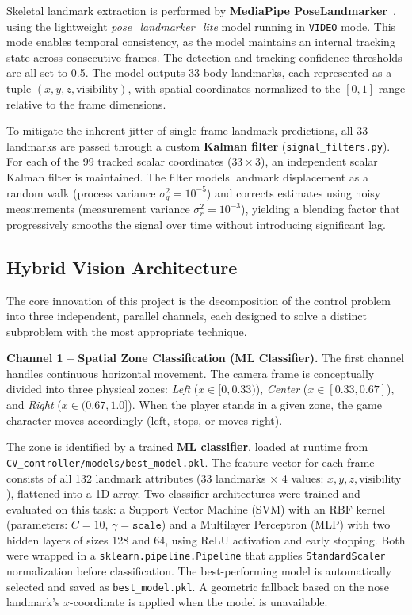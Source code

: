 \documentclass[10pt,twocolumn,a4paper]{article}
\begin{document}
	Skeletal landmark extraction is performed by \textbf{MediaPipe PoseLandmarker}~\cite{lugaresi2019mediapipe}, using the lightweight \textit{pose\_landmarker\_lite} model running in \texttt{VIDEO} mode. This mode enables temporal consistency, as the model maintains an internal tracking state across consecutive frames. The detection and tracking confidence thresholds are all set to 0.5. The model outputs 33 body landmarks, each represented as a tuple $(x, y, z, \text{visibility})$, with spatial coordinates normalized to the $[0, 1]$ range relative to the frame dimensions.

	To mitigate the inherent jitter of single-frame landmark predictions, all 33 landmarks are passed through a custom \textbf{Kalman filter} (\texttt{signal\_filters.py}). For each of the 99 tracked scalar coordinates ($33 \times 3$), an independent scalar Kalman filter is maintained. The filter models landmark displacement as a random walk (process variance $\sigma^2_q = 10^{-5}$) and corrects estimates using noisy measurements (measurement variance $\sigma^2_r = 10^{-3}$), yielding a blending factor that progressively smooths the signal over time without introducing significant lag.

	\subsection{Hybrid Vision Architecture}

	The core innovation of this project is the decomposition of the control problem into three independent, parallel channels, each designed to solve a distinct subproblem with the most appropriate technique.

	\vspace{4pt}
	\noindent\textbf{Channel 1 -- Spatial Zone Classification (ML Classifier).}
	The first channel handles continuous horizontal movement. The camera frame is conceptually divided into three physical zones: \textit{Left} ($x \in [0, 0.33)$), \textit{Center} ($x \in [0.33, 0.67]$), and \textit{Right} ($x \in (0.67, 1.0]$). When the player stands in a given zone, the game character moves accordingly (left, stops, or moves right).

	The zone is identified by a trained \textbf{ML classifier}, loaded at runtime from \texttt{CV\_controller/models/best\_model.pkl}. The feature vector for each frame consists of all 132 landmark attributes (33 landmarks $\times$ 4 values: $x, y, z, \text{visibility}$), flattened into a 1D array. Two classifier architectures were trained and evaluated on this task: a Support Vector Machine (SVM) with an RBF kernel (parameters: $C=10$, $\gamma=\texttt{scale}$) and a Multilayer Perceptron (MLP) with two hidden layers of sizes 128 and 64, using ReLU activation and early stopping. Both were wrapped in a \texttt{sklearn.pipeline.Pipeline} that applies \texttt{StandardScaler} normalization before classification. The best-performing model is automatically selected and saved as \texttt{best\_model.pkl}. A geometric fallback based on the nose landmark's $x$-coordinate is applied when the model is unavailable.
\end{document}
